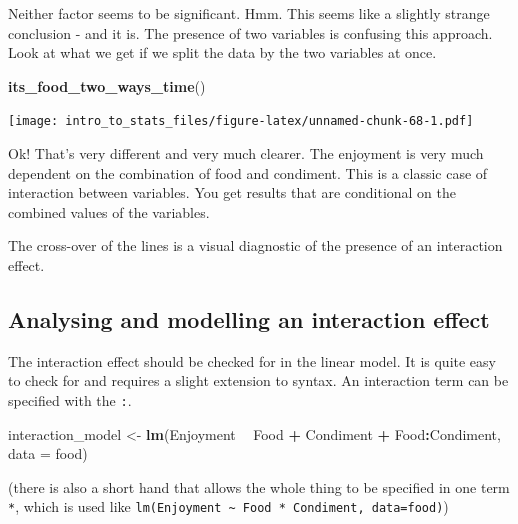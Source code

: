 \documentclass[
]{book}
\newenvironment{Shaded}{\begin{snugshade}}{\end{snugshade}}
\newcommand{\DataTypeTok}[1]{\textcolor[rgb]{0.13,0.29,0.53}{#1}}
\newcommand{\KeywordTok}[1]{\textcolor[rgb]{0.13,0.29,0.53}{\textbf{#1}}}
\newcommand{\NormalTok}[1]{#1}
\newcommand{\OperatorTok}[1]{\textcolor[rgb]{0.81,0.36,0.00}{\textbf{#1}}}
\newcommand{\StringTok}[1]{\textcolor[rgb]{0.31,0.60,0.02}{#1}}
\newenvironment{sidenote}
{ \begin{tcolorbox}[colbacktitle=blue!50!white,
title=huh?,coltitle=white,
fonttitle=\bfseries] }
{  \end{tcolorbox} }
\begin{document}
Neither factor seems to be significant. Hmm. This seems like a slightly strange conclusion - and it is. The presence of two variables is confusing this approach. Look at what we get if we split the data by the two variables at once.

\begin{Shaded}
\begin{Highlighting}[]
\KeywordTok{its_food_two_ways_time}\NormalTok{()}
\end{Highlighting}
\end{Shaded}

\texttt{[image: intro\_to\_stats\_files/figure-latex/unnamed-chunk-68-1.pdf]}

Ok! That's very different and very much clearer. The enjoyment is very much dependent on the combination of food and condiment. This is a classic case of interaction between variables. You get results that are conditional on the combined values of the variables.

\begin{sidenote}
The cross-over of the lines is a visual diagnostic of the presence of an interaction effect.
\end{sidenote}

\hypertarget{analysing-and-modelling-an-interaction-effect}{%
\subsection{Analysing and modelling an interaction effect}\label{analysing-and-modelling-an-interaction-effect}}

The interaction effect should be checked for in the linear model. It is quite easy to check for and requires a slight extension to syntax. An interaction term can be specified with the \texttt{:}.

\begin{Shaded}
\begin{Highlighting}[]
\NormalTok{interaction_model <-}\StringTok{ }\KeywordTok{lm}\NormalTok{(Enjoyment }\OperatorTok{~}\StringTok{ }\NormalTok{Food }\OperatorTok{+}\StringTok{ }\NormalTok{Condiment }\OperatorTok{+}\StringTok{ }\NormalTok{Food}\OperatorTok{:}\NormalTok{Condiment, }\DataTypeTok{data =}\NormalTok{ food)}
\end{Highlighting}
\end{Shaded}

(there is also a short hand that allows the whole thing to be specified in one term \texttt{*}, which is used like \texttt{lm(Enjoyment\ \textasciitilde{}\ Food\ *\ Condiment,\ data=food)})
\end{document}
